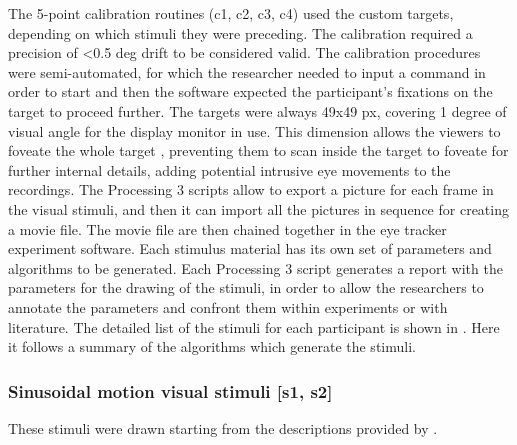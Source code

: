 The 5-point calibration routines (c1, c2, c3, c4) used the custom targets, depending on which stimuli they were preceding. The calibration required a precision of \textless 0.5 deg drift to be considered valid. The calibration procedures were semi-automated, for which the researcher needed to input a command in order to start and then the software expected the participant’s fixations on the target to proceed further. The targets were always 49x49 px, covering 1 degree of visual angle for the display monitor in use. This dimension allows the viewers to foveate the whole target \citep[p. 2]{leigh2015neurology}, preventing them to scan inside the target to foveate for further internal details, adding potential intrusive eye movements to the recordings.
The Processing 3 scripts allow to export a picture for each frame in the visual stimuli, and then it can import all the pictures in sequence for creating a movie file. The movie file are then chained together in the eye tracker experiment software.
Each stimulus material has its own set of parameters and algorithms to be generated. Each Processing 3 script generates a report with the parameters for the drawing of the stimuli, in order to allow the researchers to annotate the parameters and confront them within experiments or with literature. The detailed list of the stimuli for each participant is shown in . Here it follows a summary of the algorithms which generate the stimuli.



\subsubsection{Sinusoidal motion visual stimuli [s1, s2]}
\label{sec:expsinestimuli}

These stimuli were drawn starting from the descriptions provided by \cite{vonhofsten1997smoothpursuit}.

